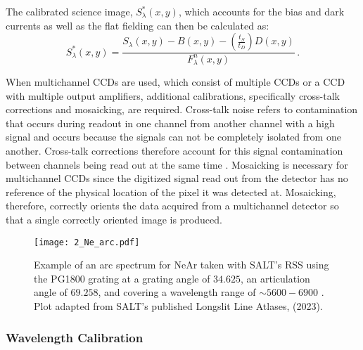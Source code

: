 The calibrated science image, $S^{*}_{\lambda}(x,y)$, which accounts for the bias and dark currents as well as the flat fielding can then be calculated as:
\begin{equation} \label{eq:science_cal}
    S^{*}_{\lambda}(x,y) = \frac{S_{\lambda}(x,y) - B(x,y) - (\frac{t_{S}}{t_{D}})D(x,y)}{F^{n}_{\lambda}(x,y)}\,.
\end{equation}

When multichannel \glspl{CCD} are used, which consist of multiple \glspl{CCD} or a \gls{CCD} with multiple output amplifiers, additional calibrations, specifically cross-talk corrections and mosaicking, are required. Cross-talk noise refers to contamination that occurs during readout in one channel from another channel with a high signal and occurs because the signals can not be completely isolated from one another. Cross-talk corrections therefore account for this signal contamination between channels being read out at the same time \citep{CrossTalk}. Mosaicking is necessary for multichannel \glspl{CCD} since the digitized signal read out from the detector has no reference of the physical location of the pixel it was detected at. Mosaicking, therefore, correctly orients the data acquired from a multichannel detector so that a single correctly oriented image is produced.

\begin{figure}[t]
    \centering
    \texttt{[image: 2\_Ne\_arc.pdf]}
    \caption{Example of an arc spectrum for NeAr taken with \gls{SALT}'s \gls{RSS} using the PG1800 grating at a grating angle of $34.625$\degr, an articulation angle of $69.258$\degr, and covering a wavelength range of $\sim5600 - 6900$ \angstrom. Plot adapted from \gls{SALT}'s published Longslit Line Atlases, (2023).\protect\footnotemark}
    \label{fig:Ne_arc}
\end{figure}

\subsubsection{Wavelength Calibration}

